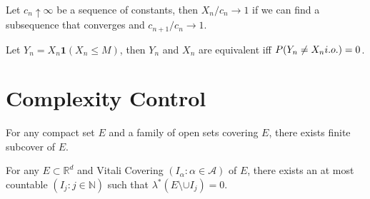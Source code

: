 \begin{method}
    Let \(c_{n} \uparrow \infty\) be a sequence of constants, then \(X_{n} /c_{n} \to 1\) if we can find a subsequence that converges and \(c_{n+1}/c_{n} \to 1\).
\end{method}

\begin{method}[Truncating]
    Let \(Y_{n} = X_{n} \mathbf{1}(X_{n} \leq M)\), then \(Y_{n}\) and \(X_{n}\) are equivalent iff \(P\pqty{Y_{n} \neq X_{n} i.o.} = 0\). 
\end{method}


\section{Complexity Control}
    \begin{method}[Compactness]
        For any compact set \(E\) and a family of open sets covering \(E\), there exists finite subcover of \(E\). 
    \end{method}
    
    \begin{method}
        For any \(E \subset \mathbb{R}^{d}\) and Vitali Covering \((I_{\alpha}: \alpha \in \mathcal{A})\) of \(E\), there exists an at most countable  \((I_{j}: j\in \mathbb{N})\) such that \(\lambda^{*}(E \setminus \cup I_{j}) = 0\). 
    \end{method}

    \begin{method}
        
    \end{method}
    
    \begin{method}
        
    \end{method}